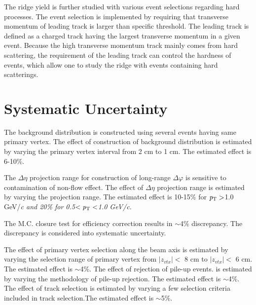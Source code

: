 \documentclass[ALICE,manyauthors]{cernphprep}
\begin{document}
The ridge yield is further studied with various event selections regarding hard processes. The event selection is implemented by requiring that transverse momentum of leading track is larger than specific threshold. The leading track is defined as a charged track having the largest transverse momentum in a given event. Because the high transverse momentum track mainly comes from hard scattering, the requirement of the leading track can control the hardness of events, which allow one to study the ridge with events containing hard scatterings.

\section{Systematic Uncertainty}
The background distribution is constructed using several events having same primary vertex. The effect of construction of background distribution is estimated by varying the primary vertex interval from 2 cm to 1 cm. The estimated effect is 6-10\%.

The $\Delta\eta$ projection range for construction of long-range $\Delta\varphi$ is sensitive to contamination of non-flow effect. The effect of  $\Delta\eta$ projection range is estimated by varying the projection range. The estimated effect is 10-15\% for $\it{p}_{\rm{T}}>$1.0 GeV/\it{c}\rm{} and 20\% for 0.5$<\it{p}_{\rm{T}}<$1.0 GeV/\it{c}\rm{}. 

The M.C. closure test for efficiency correction results in $\sim$4\% discrepancy. The discrepancy is considered into systematic uncertainty.

The effect of primary vertex selection along the beam axis is estimated by varying the selection range of primary vertex from $|z_{vtx}|<$ 8 cm to $|z_{vtx}|<$ 6 cm. The estimated effect is $\sim$4\%. The effect of rejection of pile-up events. is estimated by varying the methodology of pile-up rejection. The estimated effect is $\sim$4\%. The effect of track selection is estimated by varying a few selection criteria included in track selection.The estimated effect is $\sim$5\%. 
\end{document}
